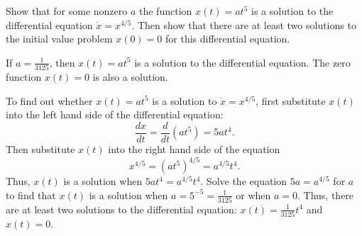 \documentclass{ximera}
\begin{document}
\begin{exercise}  \label{c6.1.4A}
Show that for some nonzero $a$ the function $x(t)=at^5$ is a solution to the
differential equation $\dot{x}=x^{4/5}$.  Then show that there are at least
two solutions to the initial value problem $x(0)=0$ for this differential
equation.

\begin{solution}
\ans If $a = \frac{1}{3125}$, then $x(t) = at^5$ is a solution
to the differential equation.  The zero function $x(t) = 0$ is also a
solution.

\soln To find out whether $x(t) = at^5$ is a solution to
$\dot{x} = x^{4/5}$, first substitute $x(t)$ into the left hand side of
the differential equation:
\[
\frac{dx}{dt} = \frac{d}{dt}(at^5) = 5at^4.
\]
Then substitute $x(t)$ into the right hand side of the equation
\[
x^{4/5} = (at^5)^{4/5} = a^{4/5}t^4.
\]
Thus, $x(t)$ is a solution when $5at^4 = a^{4/5}t^4$.  Solve the equation
$5a = a^{4/5}$ for $a$ to find that $x(t)$ is a solution when $a = 5^{-5}
= \frac{1}{3125}$ or when $a = 0$.  Thus, there are at least two solutions
to the differential equation: $x(t) = \frac{1}{3125}t^4$ and $x(t) = 0$.


\end{solution}
\end{exercise}


\CEXER
\end{document}
